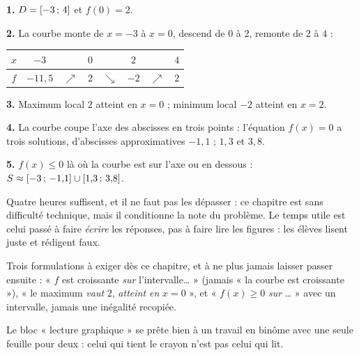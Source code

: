 \begin{corrige}
\textbf{1.} $D = \left[-3\,;\,4\right]$ et $f(0) = 2$.

\textbf{2.} La courbe monte de $x = -3$ à $x = 0$, descend de $0$ à $2$,
remonte de $2$ à $4$ :

\begin{center}\footnotesize
\begin{tabular}{|c|ccccccc|}
\hline
$x$ & $-3$ & & $0$ & & $2$ & & $4$\\
\hline
$f$ & $-11{,}5$ & $\nearrow$ & $2$ & $\searrow$ & $-2$ & $\nearrow$ & $2$\\
\hline
\end{tabular}
\end{center}

\textbf{3.} Maximum local $2$ atteint en $x = 0$ ; minimum local $-2$
atteint en $x = 2$.

\textbf{4.} La courbe coupe l'axe des abscisses en trois points : l'équation
$f(x) = 0$ a trois solutions, d'abscisses approximatives $-1{,}1$ ; $1{,}3$
et $3{,}8$.

\textbf{5.} $f(x) \leq 0$ là où la courbe est sur l'axe ou en dessous :
$S \approx \left[-3\,;\,-1{,}1\right]\cup\left[1{,}3\,;\,3{,}8\right]$.
\end{corrige}

\begin{notepourlaclasse}
Quatre heures suffisent, et il ne faut pas les dépasser : ce chapitre est
sans difficulté technique, mais il conditionne la note du problème. Le temps
utile est celui passé à faire \emph{écrire} les réponses, pas à faire lire
les figures : les élèves lisent juste et rédigent faux.

Trois formulations à exiger dès ce chapitre, et à ne plus jamais laisser
passer ensuite : « $f$ est croissante \emph{sur} l'intervalle… » (jamais
« la courbe est croissante »), « le maximum \emph{vaut} $2$, \emph{atteint
en} $x = 0$ », et « $f(x) \geq 0$ \emph{sur} … » avec un intervalle, jamais
une inégalité recopiée.

Le bloc « lecture graphique » se prête bien à un travail en binôme avec une
seule feuille pour deux : celui qui tient le crayon n'est pas celui qui lit.
\end{notepourlaclasse}
